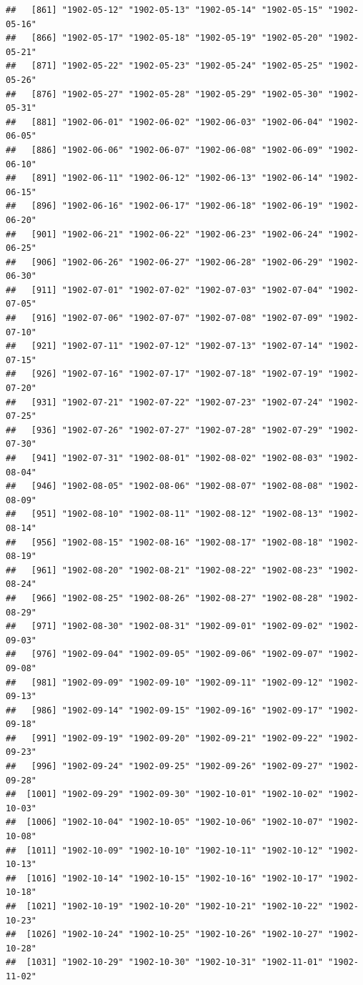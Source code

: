 \documentclass{article}\usepackage[]{graphicx}\usepackage[]{color}
\makeatletter
\newenvironment{kframe}{%
 \def\at@end@of@kframe{}%
 \ifinner\ifhmode%
  \def\at@end@of@kframe{\end{minipage}}%
  \begin{minipage}{\columnwidth}%
 \fi\fi%
 \def\FrameCommand##1{\hskip\@totalleftmargin \hskip-\fboxsep
 \colorbox{shadecolor}{##1}\hskip-\fboxsep
     \hskip-\linewidth \hskip-\@totalleftmargin \hskip\columnwidth}%
 \MakeFramed {\advance\hsize-\width
   \@totalleftmargin\z@ \linewidth\hsize
   \@setminipage}}%
 {\par\unskip\endMakeFramed%
 \at@end@of@kframe}
\newenvironment{knitrout}{}{} %
\makeatother
\begin{document}
\begin{description}
\begin{knitrout}
\begin{kframe}
\begin{verbatim}
##   [861] "1902-05-12" "1902-05-13" "1902-05-14" "1902-05-15" "1902-05-16"
##   [866] "1902-05-17" "1902-05-18" "1902-05-19" "1902-05-20" "1902-05-21"
##   [871] "1902-05-22" "1902-05-23" "1902-05-24" "1902-05-25" "1902-05-26"
##   [876] "1902-05-27" "1902-05-28" "1902-05-29" "1902-05-30" "1902-05-31"
##   [881] "1902-06-01" "1902-06-02" "1902-06-03" "1902-06-04" "1902-06-05"
##   [886] "1902-06-06" "1902-06-07" "1902-06-08" "1902-06-09" "1902-06-10"
##   [891] "1902-06-11" "1902-06-12" "1902-06-13" "1902-06-14" "1902-06-15"
##   [896] "1902-06-16" "1902-06-17" "1902-06-18" "1902-06-19" "1902-06-20"
##   [901] "1902-06-21" "1902-06-22" "1902-06-23" "1902-06-24" "1902-06-25"
##   [906] "1902-06-26" "1902-06-27" "1902-06-28" "1902-06-29" "1902-06-30"
##   [911] "1902-07-01" "1902-07-02" "1902-07-03" "1902-07-04" "1902-07-05"
##   [916] "1902-07-06" "1902-07-07" "1902-07-08" "1902-07-09" "1902-07-10"
##   [921] "1902-07-11" "1902-07-12" "1902-07-13" "1902-07-14" "1902-07-15"
##   [926] "1902-07-16" "1902-07-17" "1902-07-18" "1902-07-19" "1902-07-20"
##   [931] "1902-07-21" "1902-07-22" "1902-07-23" "1902-07-24" "1902-07-25"
##   [936] "1902-07-26" "1902-07-27" "1902-07-28" "1902-07-29" "1902-07-30"
##   [941] "1902-07-31" "1902-08-01" "1902-08-02" "1902-08-03" "1902-08-04"
##   [946] "1902-08-05" "1902-08-06" "1902-08-07" "1902-08-08" "1902-08-09"
##   [951] "1902-08-10" "1902-08-11" "1902-08-12" "1902-08-13" "1902-08-14"
##   [956] "1902-08-15" "1902-08-16" "1902-08-17" "1902-08-18" "1902-08-19"
##   [961] "1902-08-20" "1902-08-21" "1902-08-22" "1902-08-23" "1902-08-24"
##   [966] "1902-08-25" "1902-08-26" "1902-08-27" "1902-08-28" "1902-08-29"
##   [971] "1902-08-30" "1902-08-31" "1902-09-01" "1902-09-02" "1902-09-03"
##   [976] "1902-09-04" "1902-09-05" "1902-09-06" "1902-09-07" "1902-09-08"
##   [981] "1902-09-09" "1902-09-10" "1902-09-11" "1902-09-12" "1902-09-13"
##   [986] "1902-09-14" "1902-09-15" "1902-09-16" "1902-09-17" "1902-09-18"
##   [991] "1902-09-19" "1902-09-20" "1902-09-21" "1902-09-22" "1902-09-23"
##   [996] "1902-09-24" "1902-09-25" "1902-09-26" "1902-09-27" "1902-09-28"
##  [1001] "1902-09-29" "1902-09-30" "1902-10-01" "1902-10-02" "1902-10-03"
##  [1006] "1902-10-04" "1902-10-05" "1902-10-06" "1902-10-07" "1902-10-08"
##  [1011] "1902-10-09" "1902-10-10" "1902-10-11" "1902-10-12" "1902-10-13"
##  [1016] "1902-10-14" "1902-10-15" "1902-10-16" "1902-10-17" "1902-10-18"
##  [1021] "1902-10-19" "1902-10-20" "1902-10-21" "1902-10-22" "1902-10-23"
##  [1026] "1902-10-24" "1902-10-25" "1902-10-26" "1902-10-27" "1902-10-28"
##  [1031] "1902-10-29" "1902-10-30" "1902-10-31" "1902-11-01" "1902-11-02"

\end{verbatim}
\end{kframe}
\end{knitrout}
\end{description}
\end{document}
